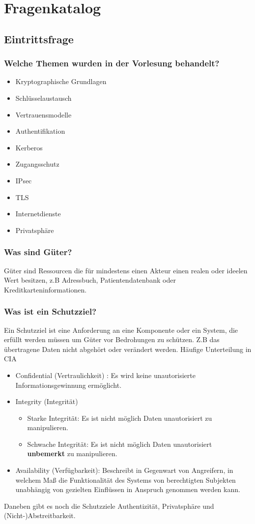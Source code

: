 \section{Fragenkatalog}
\subsection{Eintrittsfrage}
	\subsubsection{Welche Themen wurden in der Vorlesung behandelt?}
		\begin{itemize}
			\item{Kryptographische Grundlagen}
			\item{Schlüsselaustausch}
			\item{Vertrauensmodelle}
			\item{Authentifikation}
			\item{Kerberos}
			\item{Zugangsschutz}
			\item{IPsec}
			\item{TLS}
			\item{Internetdienste}
			\item{Privatsphäre}
		\end{itemize}
		
	\subsubsection{Was sind Güter?}
	Güter sind Ressourcen die für mindestens einen Akteur einen realen oder ideelen Wert besitzen, z.B Adressbuch, Patientendatenbank oder Kreditkarteninformationen.
	
	\subsubsection{Was ist ein Schutzziel?}
	Ein Schutzziel ist eine Anforderung an eine Komponente oder ein System, die erfüllt werden müssen um Güter vor Bedrohungen zu schützen. Z.B das übertragene Daten nicht abgehört oder verändert werden.
	Häufige Unterteilung in CIA
	\begin{itemize}
		\item Confidential (Vertraulichkeit) : Es wird keine unautorisierte Informationsgewinnung ermöglicht.
		\item Integrity (Integrität) 
		\begin{itemize}
			\item Starke Integrität: Es ist nicht möglich Daten unautorisiert zu manipulieren.
			\item Schwache Integrität: Es ist nicht möglich Daten unautorisiert \textbf{unbemerkt} zu manipulieren.
		\end{itemize}
		\item Availability (Verfügbarkeit): Beschreibt in Gegenwart von Angreifern, in welchem Maß die Funktionalität des Systems von berechtigten Subjekten unabhängig von gezielten Einflüssen in Anspruch genommen werden kann.
	\end{itemize}
	Daneben gibt es noch die Schutzziele Authentizität, Privatsphäre und (Nicht-)Abstreitbarkeit.
	
